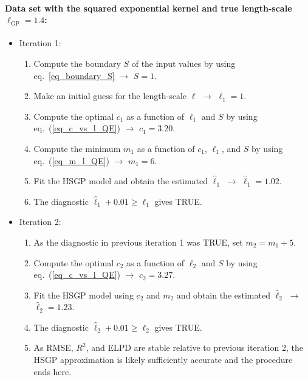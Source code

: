 \paragraph*{Data set with the squared exponential kernel and true length-scale $\ell_{\text{GP}} = 1.4$:} 
\begin{itemize}
\item[] Iteration 1:
	\begin{enumerate}
	\item Compute the boundary $S$ of the input values by using eq.~\eqref{eq_boundary_S} $\to$ $S=1$.
	\item Make an initial guess for the length-scale $\ell$ $\to$ $\ell_1=1$.
	
	\item Compute the optimal $c_1$ as a function of $\ell_1$ and $S$ by using eq.~(\ref{eq_c_vs_l_QE}) $\to$ $c_1=3.20$.
	
	\item Compute the minimum $m_1$ as a function of $c_1$, $\ell_1$, and $S$ by using eq.~(\ref{eq_m_l_QE}) $\to$ $m_1=6$.
	
	\item Fit the HSGP model and obtain the estimated $\hat{\ell}_1$ $\to$ $\hat{\ell}_1=1.02$.
	
	\item The diagnostic $\hat{\ell}_1 + 0.01 \geq \ell_1$ gives TRUE.
	\end{enumerate}
	
\item[] Iteration 2:
	\begin{enumerate}
	\item As the diagnostic in previous iteration 1 was TRUE, set $m_2 = m_1 + 5$.
	
	\item Compute the optimal $c_2$ as a function of $\ell_2$ and $S$ by using eq.~(\ref{eq_c_vs_l_QE}) $\to$ $c_2=3.27$.
	
	\item Fit the HSGP model using $c_2$ and $m_2$ and obtain the estimated $\hat{\ell}_2$ $\to$ $\hat{\ell}_2=1.23$.
	
	\item The diagnostic $\hat{\ell}_2 + 0.01 \geq \ell_2$ gives TRUE.
	
	\item As RMSE, $R^2$, and ELPD are stable relative to previous iteration 2, the HSGP approximation is likely sufficiently accurate and the procedure ends here.
	\end{enumerate}
	
\end{itemize}




